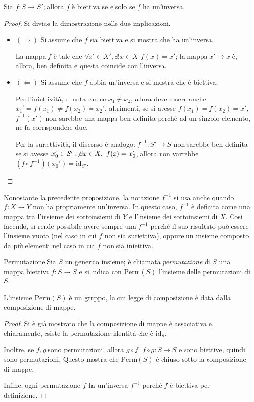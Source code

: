 \documentclass[11pt, a4paper]{scrartcl}
\theoremstyle{definition}
\numberwithin{esempio}{section}
\theoremstyle{definition}
\numberwithin{obs}{section}
\numberwithin{nota}{section}
\numberwithin{equation}{subsection}
\begin{document}
\begin{prop}
	{}{}
	Sia $f:S \to S'$; allora $f$ \`e biettiva se e solo se $f$ ha un'inversa.
	\begin{proof}
		Si divide la dimostrazione nelle due implicazioni.
		\begin{itemize}
			\item $(\Rightarrow )$ Si assume che $f$ sia biettiva e si mostra che ha un'inversa.

				La mappa $f$ \`e tale che $\forall x' \in X', \exists ! x \in X : f(x) = x'$; la mappa $x' \mapsto x$ \`e, allora, ben definita e questa coincide con l'inversa.
			\item $(\Leftarrow)$ Si assume che $f$ abbia un'inversa e si mostra che \`e biettiva.

				Per l'iniettivit\`a, si nota che se $x_1\neq x_2 $, allora deve essere anche $x_1' = f(x_1) \neq f(x_2) = x_2'$, altrimenti, se si avesse $f(x_1) = f(x_2) = x'$, $f^{-1} (x')$ non sarebbe una mappa ben definita perch\'e ad un singolo elemento, ne fa corrispondere due.

				Per la suriettivit\`a, il discorso \`e analogo: $f^{-1} :S'\to S$ non sarebbe ben definita se si avesse $x_0' \in S' : \not \exists x \in X , \ f(x) = x_0'$, allora non varrebbe $(f\circ f^{-1} ) (x_0') = \mathrm{id}_{S'}  $.
		\end{itemize}
	\end{proof}
\end{prop}
\noindent Nonostante la precedente proposizione, la notazione $f^{-1} $ si usa anche quando $f:X \to Y$ non ha propriamente un'inversa.
In questo caso, $f^{-1} $ \`e definita come una mappa tra l'insieme dei sottoinsiemi di $Y$ e l'insieme dei sottoinsiemi di $X$.
Cos\`i facendo, si rende possibile avere sempre una $f^{-1} $ perch\'e il suo risultato pu\`o essere l'insieme vuoto (nel caso in cui $f$ non sia suriettiva), oppure un insieme composto da pi\`u elementi nel caso in cui $f$ non sia iniettiva.
\begin{definizione}
	{Permutazione}{}
	Sia $S$ un generico insieme; \`e chiamata \textit{permutazione} di $S$ una mappa biettiva $f: S \to S$ e si indica con $\mathrm{Perm}(S) $ l'insieme delle permutazioni di $S$.
\end{definizione}
\begin{prop}
	{}{}
	L'insieme $\mathrm{Perm} (S)$ \`e un gruppo, la cui legge di composizione \`e data dalla composizione di mappe.
	\begin{proof}
	Si \`e gi\`a mostrato che la composizione di mappe \`e associativa e, chiaramente, esiste la permutazione identit\`a che \`e $\mathrm{id} _S$.

	Inoltre, se $f,g$ sono permutazioni, allora $g\circ f, \ f\circ g : S \to S$ e sono biettive, quindi sono permutazioni. Questo mostra che $\mathrm{Perm} (S)$ \`e chiuso sotto la composizione di mappe.

	Infine, ogni permutazione $f$ ha un'inversa $f^{-1} $ perch\'e $f$ \`e biettiva per definizione.	
	\end{proof}
\end{prop}
\end{document}
